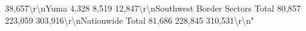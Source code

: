 \documentclass[
  12pt,
]{book}
\newenvironment{Shaded}{\begin{snugshade}}{\end{snugshade}}
\begin{document}
\begin{Shaded}
\begin{Highlighting}[]
38,657\textbackslash{}r\textbackslash{}nYuma                                         4,328                      8,519                     12,847\textbackslash{}r\textbackslash{}nSouthwest Border Sectors Total               80,857                    223,059                   303,916\textbackslash{}r\textbackslash{}nNationwide Total                             81,686                    228,845                   310,531\textbackslash{}r\textbackslash{}n"                                                                                                                                                                                                                                                                                                                                                                                                                                                                                                                                                                                                                                                                                                                                                                                                                                                                                                                                                                                                                                                                                                                                                                                                                                                                                                                                                                                                                                                                                                                                                                                                                                                                                                                                                                                                                                                                                                                                                                                                                                                                                                                                                                                                                                                                                                                                                                                                                                                                                                                                                                                                                                                                                                                                                                                                                                                                                                                                                           
\end{Highlighting}
\end{Shaded}
\end{document}
